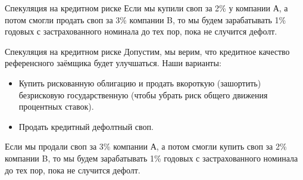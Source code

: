 \documentclass{beamer}
\begin{document}
\begin{frame}{Спекуляция на кредитном риске}
\justify
Если мы купили своп за 2\% у компании А, а потом смогли продать своп за 3\% компании B, то мы будем зарабатывать 1\% годовых с застрахованного номинала до тех пор, пока не случится дефолт.

\justify
\centering
{}
\end{frame}



\begin{frame}{Спекуляция на кредитном риске}
\justify
Допустим, мы верим, что кредитное качество референсного заёмщика будет улучшаться. Наши варианты:
\begin{itemize}
\justifying
\item Купить рискованную облигацию и продать вкороткую (зашортить) безрисковую государственную (чтобы убрать риск общего движения процентных ставок).
\item Продать кредитный дефолтный своп.
\end{itemize}

\justify
Если мы продали своп за 3\% компании А, а потом смогли купить своп за 2\% компании B, то мы будем зарабатывать 1\% годовых с застрахованного номинала до тех пор, пока не случится дефолт.
\end{frame}
\end{document}
